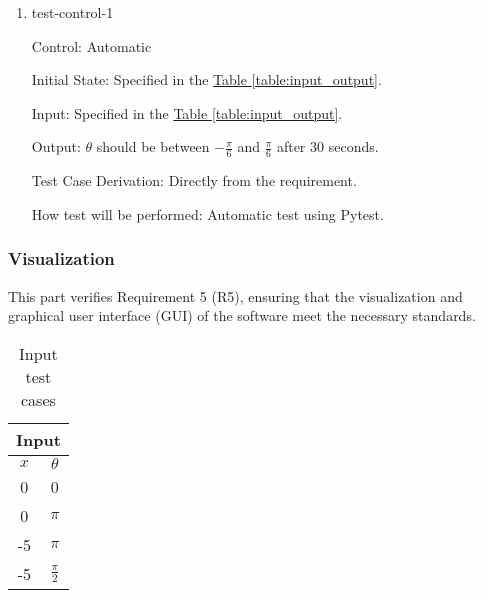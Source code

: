 \documentclass[12pt, titlepage]{article}
\begin{document}
\begin{enumerate}

  \item{test-control-1\\}

        Control: Automatic

        Initial State: Specified in the \hyperref[table:input_output]{Table \ref*{table:input_output}}.

        Input: Specified in the \hyperref[table:input_output]{Table \ref*{table:input_output}}.

        Output: $\theta$ should be between $-\frac{\pi}{6}$ and $\frac{\pi}{6}$ after 30 seconds.

        Test Case Derivation: Directly from the requirement.

        How test will be performed:
        Automatic test using Pytest.

\end{enumerate}

\subsubsection{Visualization} \label{func_test_visualization}

This part verifies Requirement 5 (R5), ensuring that the visualization
and graphical user interface (GUI) of the software meet the necessary standards.

\begin{table}[ht]
  \centering
  \caption{Input test cases} \label{table:input_vis}
  \vspace*{2mm}
  \begin{tabular}{|c|c|}
    \hline
    \multicolumn{2}{|c|}{Input} \\ \hline
    $x$ & $\theta$              \\ \hline
    0   & 0                     \\ \hline
    0   & $\pi$                 \\ \hline
    -5  & $\pi$                 \\ \hline
    -5  & $\frac{\pi}{2}$       \\ \hline
  \end{tabular}
\end{table}

\end{document}
